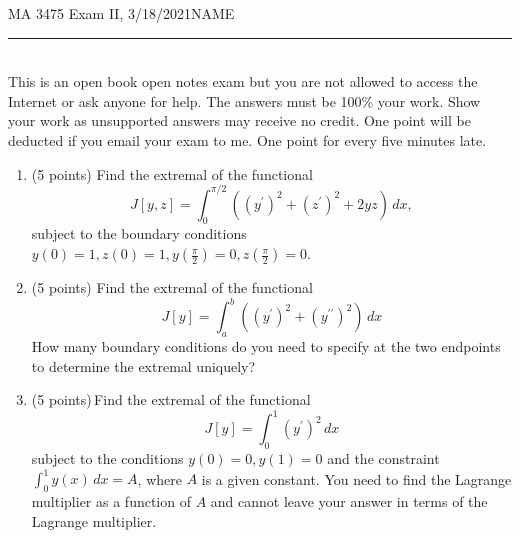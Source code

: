 \documentclass[12pt]{article}
\begin{document}
\noindent MA 3475\,\,Exam II, 3/18/2021\hfill NAME
\rule{6cm}{1pt}\\

This is an open book open notes exam but you are not allowed to access the Internet or ask anyone for help. The answers must be 100\% your work. Show your work as unsupported answers may receive no credit. One point will be deducted if you email your exam to me. One point for every five minutes late. 

\begin{enumerate}
\item (5 points)\,\,Find the extremal of the functional
$$
J[y,z] = \int_0^{\pi/2} \left((y^{\prime})^2 + (z^{\prime})^2 + 2y z \right)\,dx,
$$
subject to the boundary conditions $y(0) = 1, z(0) = 1, y\left(\frac{\pi}{2}\right) = 0,  z\left(\frac{\pi}{2}\right) = 0$.
\newpage
\item (5 points)\,\,Find the extremal of the functional
$$
J[y] = \int_a ^b \left((y^{\prime})^2 + (y^{\prime\prime})^2\right) \,dx
$$
How many boundary conditions do you need to specify at the two endpoints to determine the extremal uniquely?
\newpage
\item(5 points)\,Find the extremal of the functional
$$
J[y] = \int_0^1 (y^{\prime})^2\,dx
$$
subject to the conditions $y(0) = 0, y(1) = 0$ and the constraint $\int_0^1 y(x)\,dx = A$, where $A$ is a given constant. You need to find the Lagrange multiplier as a function of $A$ and cannot leave your answer in terms of the Lagrange multiplier.\\

\end{enumerate}
\end{document}
